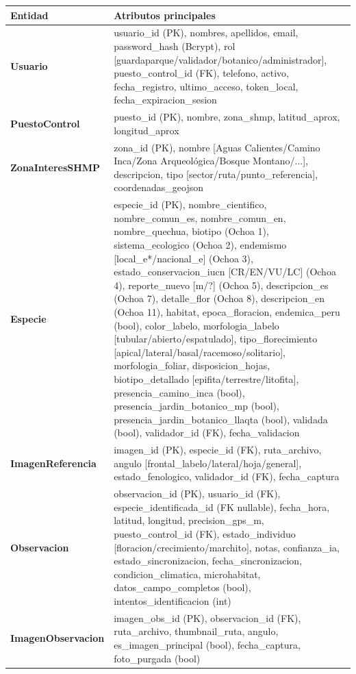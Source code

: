 \documentclass[12pt, a4paper]{article}
\begin{document}
\begin{longtable}{|p{3.5cm}|p{11cm}|}
\hline
\textbf{Entidad} & \textbf{Atributos principales} \\
\hline
\endhead
\textbf{Usuario} & usuario\_id (PK), nombres, apellidos, email, password\_hash (Bcrypt), rol [guardaparque/validador/botanico/administrador], puesto\_control\_id (FK), telefono, activo, fecha\_registro, ultimo\_acceso, token\_local, fecha\_expiracion\_sesion \\
\hline
\textbf{PuestoControl} & puesto\_id (PK), nombre, zona\_shmp, latitud\_aprox, longitud\_aprox \\
\hline
\textbf{ZonaInteresSHMP} & zona\_id (PK), nombre [Aguas Calientes/Camino Inca/Zona Arqueol\'ogica/Bosque Montano/...], descripcion, tipo [sector/ruta/punto\_referencia], coordenadas\_geojson \\
\hline
\textbf{Especie} & especie\_id (PK), nombre\_cientifico, nombre\_comun\_es, nombre\_comun\_en, nombre\_quechua, biotipo (Ochoa 1), sistema\_ecologico (Ochoa 2), endemismo [local\_e*/nacional\_e] (Ochoa 3), estado\_conservacion\_iucn [CR/EN/VU/LC] (Ochoa 4), reporte\_nuevo [m/?] (Ochoa 5), descripcion\_es (Ochoa 7), detalle\_flor (Ochoa 8), descripcion\_en (Ochoa 11), habitat, epoca\_floracion, endemica\_peru (bool), color\_labelo, morfologia\_labelo [tubular/abierto/espatulado], tipo\_florecimiento [apical/lateral/basal/racemoso/solitario], morfologia\_foliar, disposicion\_hojas, biotipo\_detallado [epifita/terrestre/litofita], presencia\_camino\_inca (bool), presencia\_jardin\_botanico\_mp (bool), presencia\_jardin\_botanico\_llaqta (bool), validada (bool), validador\_id (FK), fecha\_validacion \\
\hline
\textbf{ImagenReferencia} & imagen\_id (PK), especie\_id (FK), ruta\_archivo, angulo [frontal\_labelo/lateral/hoja/general], estado\_fenologico, validador\_id (FK), fecha\_captura \\
\hline
\textbf{Observacion} & observacion\_id (PK), usuario\_id (FK), especie\_identificada\_id (FK nullable), fecha\_hora, latitud, longitud, precision\_gps\_m, puesto\_control\_id (FK), estado\_individuo [floracion/crecimiento/marchito], notas, confianza\_ia, estado\_sincronizacion, fecha\_sincronizacion, condicion\_climatica, microhabitat, datos\_campo\_completos (bool), intentos\_identificacion (int) \\
\hline
\textbf{ImagenObservacion} & imagen\_obs\_id (PK), observacion\_id (FK), ruta\_archivo, thumbnail\_ruta, angulo, es\_imagen\_principal (bool), fecha\_captura, foto\_purgada (bool) \\

\end{longtable}
\end{document}
